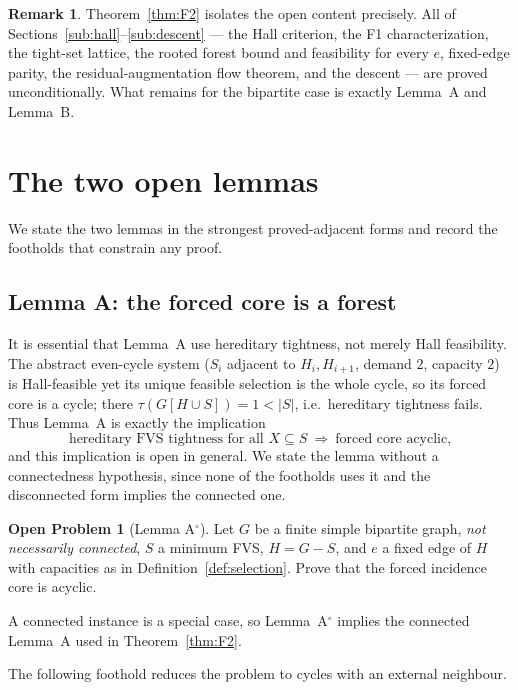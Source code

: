\documentclass[11pt]{article}
\theoremstyle{plain}
\theoremstyle{definition}
\newtheorem{remark}[theorem]{Remark}
\newtheorem{problem}[theorem]{Open Problem}
\newcommand{\FVS}{\tau}
\begin{document}
\begin{remark}
Theorem~\ref{thm:F2} isolates the open content precisely. All of
Sections~\ref{sub:hall}--\ref{sub:descent} --- the Hall criterion, the F1
characterization, the tight-set lattice, the rooted forest bound and feasibility
for every $e$, fixed-edge parity, the residual-augmentation flow theorem, and the
descent --- are proved unconditionally. What remains for the bipartite case is
exactly Lemma~A and Lemma~B.
\end{remark}

\section{The two open lemmas}\label{sec:openlemmas}

We state the two lemmas in the strongest proved-adjacent forms and record the
footholds that constrain any proof.

\subsection{Lemma A: the forced core is a forest}

It is essential that Lemma~A use hereditary tightness, not merely Hall
feasibility. The abstract even-cycle system ($S_i$ adjacent to $H_i,H_{i+1}$,
demand $2$, capacity $2$) is Hall-feasible yet its unique feasible selection is
the whole cycle, so its forced core is a cycle; there
$\FVS(G[H\cup S])=1<|S|$, i.e.\ hereditary tightness fails. Thus Lemma~A is
exactly the implication
\[
\text{hereditary FVS tightness for all }X\subseteq S
\ \Longrightarrow\
\text{forced core acyclic,}
\]
and this implication is open in general. We state the lemma without a
connectedness hypothesis, since none of the footholds uses it and the
disconnected form implies the connected one.

\begin{problem}[Lemma A$^{\circ}$]\label{prob:A}
Let $G$ be a finite simple bipartite graph, \emph{not necessarily connected},
$S$ a minimum FVS, $H=G-S$, and $e$ a fixed edge of $H$ with capacities as in
Definition~\ref{def:selection}. Prove that the forced incidence core is acyclic.
\end{problem}

A connected instance is a special case, so Lemma~A$^{\circ}$ implies the
connected Lemma~A used in Theorem~\ref{thm:F2}.

The following foothold reduces the problem to cycles with an external neighbour.
\end{document}

